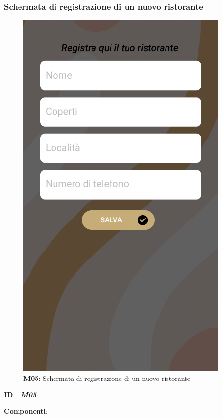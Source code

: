         \subsubsection{Schermata di registrazione di un nuovo ristorante}
        \begin{figure}[H]
            \centering
            \includegraphics[scale=0.35]{assets/diagrammi/Mockup/Mockup_SaveResturant.png}
            \caption{\textbf{M05}: Schermata di registrazione di un nuovo ristorante}\label{fig:Mockup_AddResturant}
        \end{figure}
        \begin{flushleft}
            \textbf{ID} \ \Large{ \emph{\textbf{M05}}}
        \end{flushleft}
        \textbf{Componenti}:

